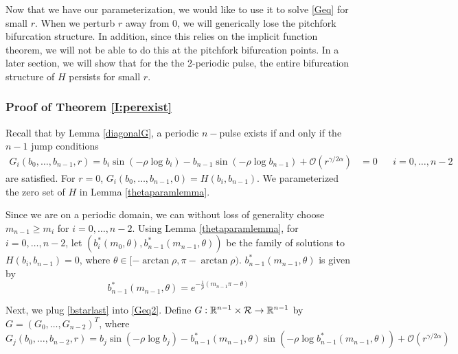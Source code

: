 \documentclass[thesis.tex]{subfiles}
\begin{document}
Now that we have our parameterization, we would like to use it to solve \eqref{Geq} for small $r$. When we perturb $r$ away from 0, we will generically lose the pitchfork bifurcation structure. In addition, since this relies on the implicit function theorem, we will not be able to do this at the pitchfork bifurcation points. In a later section, we will show that for the the 2-periodic pulse, the entire bifurcation structure of $H$ persists for small $r$.

\subsubsection{Proof of Theorem \ref{I:perexist}}

Recall that by Lemma \ref{diagonalG}, a periodic $n-$pulse exists if and only if the $n-1$ jump conditions
\begin{align}\label{Geq2}
G_i(b_0, \dots, b_{n-1}, r) = b_i \sin \left( -\rho \log b_i \right) - b_{n-1} \sin \left( -\rho \log b_{n-1} \right) + \mathcal{O}(r^{\gamma / 2 \alpha}) &= 0 && i = 0, \dots, n-2
\end{align}
are satisfied. For $r = 0$, $G_i(b_0, \dots, b_{n-1}, 0) = H(b_i, b_{n-1})$. We parameterized the zero set of $H$ in Lemma \ref{thetaparamlemma}. 

Since we are on a periodic domain, we can without loss of generality choose $m_{n-1} \geq m_i$ for $i = 0, \dots, n-2$. Using Lemma \ref{thetaparamlemma}, for $i = 0, \dots, n-2$, let $(b_i^*(m_0, \theta), b_{n-1}^*(m_{n-1}, \theta))$ be the family of solutions to $H(b_i, b_{n-1}) = 0$, where $\theta \in [-\arctan \rho, \pi - \arctan \rho)$. $b_{n-1}^*(m_{n-1}, \theta)$ is given by
\begin{equation}\label{bstarlast}
b_{n-1}^*(m_{n-1}, \theta) = e^{-\frac{1}{\rho}(m_{n-1}\pi - \theta)}
\end{equation}

Next, we plug \eqref{bstarlast} into \eqref{Geq2}. Define $G: {\mathbb R}^{n-1} \times \mathcal{R} \rightarrow {\mathbb R}^{n-1}$ by $G = (G_0, \dots, G_{n-2})^T$, where 
\begin{equation*}
G_j(b_0, \dots, b_{n-2}, r) = b_j \sin \left( -\rho \log b_j \right) - b_{n-1}^*(m_{n-1}, \theta) \sin \left( -\rho \log b_{n-1}^*(m_{n-1}, \theta) \right) + \mathcal{O}(r^{\gamma / 2 \alpha})
\end{equation*}
\end{document}
